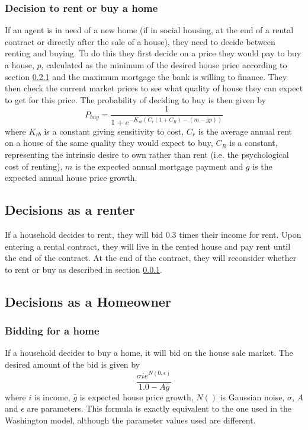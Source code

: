 \documentclass{report}
\begin{document}
\subsubsection{Decision to rent or buy a home}
\label{rentorbuy}
If an agent is in need of a new home (if in social housing, at the end of a rental contract or directly after the sale of a house), they need to decide between renting and buying. To do this they first decide on a price they would pay to buy a house, $p$, calculated as the minimum of the desired house price according to section \ref{buyahome} and the maximum mortgage the bank is willing to finance. They then check the current market prices to see what quality of house they can expect to get for this price. The probability of deciding to buy is then  given by
\begin{equation}
P_{buy} = \frac{1}{1 + e^{-K_{rb}(C_{r}(1+C_R) - (m - \bar{g}p))}}
\end{equation}
where $K_{rb}$ is a constant giving sensitivity to cost, $C_{r}$ is the average annual rent on a house of the same quality they would expect to buy, $C_R$ is a constant, representing the intrinsic desire to own rather than rent (i.e. the psychological cost of renting), $m$ is the expected annual mortgage payment and $\bar{g}$ is the expected annual house price growth.

\subsection{Decisions as a renter}
If a household decides to rent, they will bid 0.3 times their income for rent. Upon entering a rental contract, they will live in the rented house and pay rent until the end of the contract. At the end of the contract, they will reconsider whether to rent or buy as described in section \ref{rentorbuy}.

\subsection{Decisions as a Homeowner}

\subsubsection{Bidding for a home}
\label{buyahome}
If a household decides to buy a home, it will bid on the house sale market. The desired amount of the bid is given by
\begin{equation}
 \frac{\sigma i e^{N(0,\epsilon)}}{1.0 - A\bar{g}}
\end{equation}
where $i$ is income, $\bar{g}$ is expected house price growth, $N()$ is Gaussian noise, $\sigma$, $A$ and $\epsilon$ are parameters. This formula is exactly equivalent to the one used in the Washington model, although the parameter values used are different.
\end{document}
